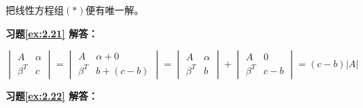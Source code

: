 把线性方程组$(\ast)$便有唯一解。

\vspace{1.5em}

\textbf{习题\ref{ex:2.21} 解答：}

$$\begin{vmatrix} A & \alpha \\ \beta^T & c \end{vmatrix} = \begin{vmatrix} A & \alpha+0 \\ \beta^T & b+(c-b) \end{vmatrix} = \begin{vmatrix} A & \alpha \\ \beta^T & b \end{vmatrix} + \begin{vmatrix} A & 0 \\ \beta^T & c-b \end{vmatrix} = (c-b)|A|$$

\vspace{1.5em}

\textbf{习题\ref{ex:2.22} 解答：}

